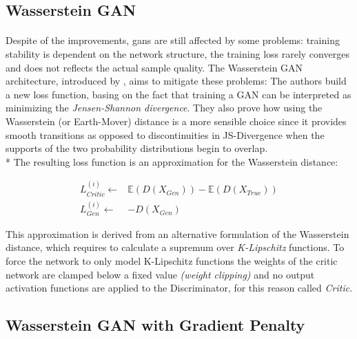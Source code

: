 \subsection{Wasserstein GAN}
\paragraph{} Despite of the improvements, \glspl{gan} are still affected by some problems: training stability is dependent on the network structure, the training loss rarely converges and does not reflects the actual sample quality. The Wasserstein GAN architecture, introduced by \citeauthor{wgan} \cite{wgan}, aims to mitigate these problems: The authors build a new loss function, basing on the fact that training a GAN can be interpreted as minimizing the \textit{Jensen-Shannon divergence}\cite{jsdivergence}. They also prove how using the Wasserstein (or Earth-Mover) \cite[\S~3]{wgan} distance is a more sensible choice since it provides smooth transitions as opposed to discontinuities in JS-Divergence when the supports of the two probability distributions begin to overlap. \\* The resulting loss function is an approximation for the Wasserstein distance:

\begin{equation}
\label{eq:wganloss}
\begin{split}
L_{Critic}^{(i)} \gets & \mathbb{E}(D(X_{Gen})) - \mathbb{E}(D(X_{True}))\\
L_{Gen}^{(i)} \gets & -D(X_{Gen}) 
\end{split}
\end{equation}

This approximation is derived from an alternative formulation of the Wasserstein distance, which requires to calculate a supremum over \textit{K-Lipschitz} functions. To force the network to only model K-Lipschitz functions the weights of the critic network are clamped below a fixed value \textit{(weight clipping)} and no output activation functions are applied to the Discriminator, for this reason called \textit{Critic}.  

\subsection{Wasserstein GAN with Gradient Penalty}
\label{sec:wgangp}
